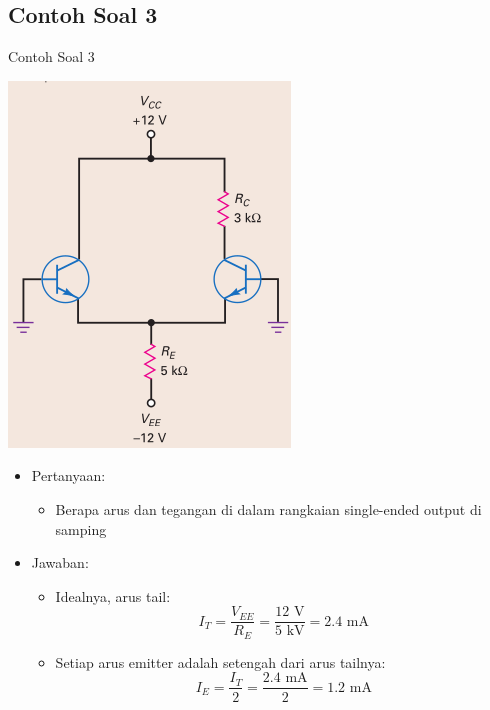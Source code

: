 \documentclass[aspectratio=169]{beamer}
\begin{document}
\subsection{Contoh Soal 3}
\begin{frame}{Contoh Soal 3}
	\begin{multicols}{2}
		\begin{center}
			\includegraphics[width=0.6\textheight]{gambar/01.latihan_soal_3}
		\end{center}
		\columnbreak
		\begin{itemize}
			\item Pertanyaan:
			\begin{itemize}
				\item Berapa arus dan tegangan di dalam rangkaian single-ended output di samping
			\end{itemize}
			\item Jawaban:
			\begin{itemize}
				\item Idealnya, arus tail:
				\[ I_T = \frac{V_{EE}}{R_E} = \frac{12 \text{ V}}{5 \text{ kV}} = 2.4 \text{ mA} \]
				\item Setiap arus emitter adalah setengah dari arus tailnya:
				\[ I_E = \frac{I_T}{2} = \frac{2.4 \text{ mA}}{2} =1.2 \text{ mA} \]
			\end{itemize}
		\end{itemize}
		\vfill\null
	\end{multicols}
\end{frame}
\end{document}
